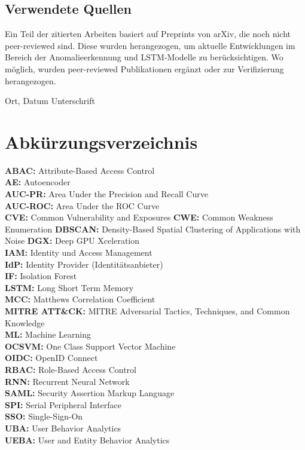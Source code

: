 \documentclass[a4paper,12pt]{article}
\begin{document}
	\subsection*{Verwendete Quellen}
	Ein Teil der zitierten Arbeiten basiert auf Preprints von arXiv, die noch nicht peer-reviewed sind. Diese wurden herangezogen, um aktuelle Entwicklungen im Bereich der Anomalieerkennung und LSTM-Modelle zu berücksichtigen. Wo möglich, wurden peer-reviewed Publikationen ergänzt oder zur Verifizierung herangezogen.

	
	\vspace{2cm}
	
	\noindent Ort, Datum \hfill Unterschrift
	\newpage
	\tableofcontents
	\newpage
	\listoffigures
	\newpage
	\listoftables
	\newpage
	
	\section*{Abkürzungsverzeichnis}
	
	\textbf{ABAC:} Attribute-Based Access Control \\[1em]
	\textbf{AE:} Autoencoder \\[1em]
	\textbf{AUC-PR:} Area Under the Precision and Recall Curve \\[1em]
	\textbf{AUC-ROC:} Area Under the ROC Curve \\[1em]
	\textbf{CVE:} Common Vulnerability and Exposures
	\textbf{CWE:} Common Weakness Enumeration
	\textbf{DBSCAN:} Density-Based Spatial Clustering of Applications with Noise
	\textbf{DGX:} Deep GPU Xceleration \\[1em]
	\textbf{IAM:} Identity und Access Management \\[1em]
	\textbf{IdP:} Identity Provider (Identitätsanbieter) \\[1em]
	\textbf{IF:} Isolation Forest \\[1em]
	\textbf{LSTM:} Long Short Term Memory \\[1em]
	\textbf{MCC:} Matthews Correlation Coefficient \\[1em]
	\textbf{MITRE ATT\&CK: } MITRE Adversarial Tactics, Techniques, 
		and Common Knowledge \\[1em]
	\textbf{ML:} Machine Learning \\[1em]
	\textbf{OCSVM:} One Class Support Vector Machine \\[1em]
	\textbf{OIDC:} OpenID Connect \\[1em]
	\textbf{RBAC:} Role-Based Access Control \\[1em]
	\textbf{RNN:} Recurrent Neural Network \\[1em]
	\textbf{SAML:} Security Assertion Markup Language \\[1em]
	\textbf {SPI:} Serial Peripheral Interface \\[1em]
	\textbf{SSO:} Single-Sign-On \\[1em]
	\textbf {UBA:} User Behavior Analytics \\[1em]
	\textbf {UEBA:} User and Entity Behavior Analytics \\[1em]
	
\end{document}
